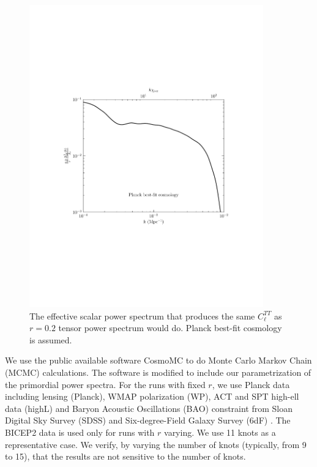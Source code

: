 \documentclass[11pt]{article}
\def \figwidth{0.9\textwidth}
\begin{document}
\begin{figure}
  \includegraphics[width = \figwidth, trim = 1in 2.9in 1in 2.9in]{ten_eff_ps.pdf}
  \caption{The effective scalar power spectrum that produces the same $C_\ell^{TT}$ as $r=0.2$ tensor power spectrum would do. Planck best-fit cosmology is assumed. \label{fig:effps}}
\end{figure}


We use the public available software CosmoMC \cite{CosmoMC} to do Monte Carlo Markov Chain (MCMC) calculations. The software is modified to include our parametrization of the primordial power spectra. For the runs with fixed $r$, we use Planck data including lensing (Planck), WMAP polarization (WP), ACT and SPT high-ell data (highL) and Baryon Acoustic Oscillations (BAO) constraint from Sloan Digital Sky Survey (SDSS) \cite{SDSSDR9} and Six-degree-Field Galaxy Survey (6dF) \cite{Jones2004, Jones2009}. The BICEP2 data is used only for runs with $r$ varying. We use 11 knots as a representative case. We verify, by varying the number of knots (typically, from 9 to 15), that the results are not sensitive to the number of knots.
\end{document}
